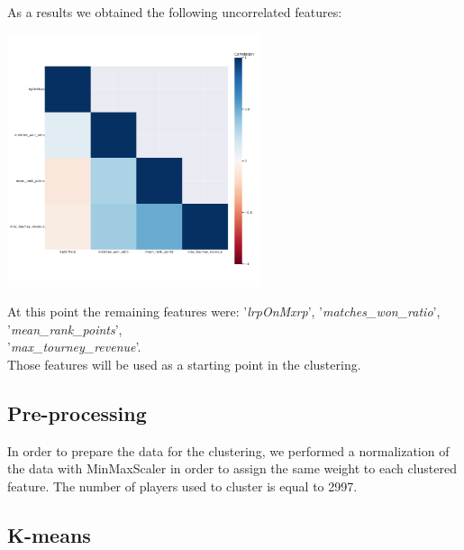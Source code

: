 As a results we obtained the following uncorrelated features:
\begin{center}
	\includegraphics[width=280px]{plots/correlation_plot}
	\label{fig:correlation_plot}
	\label{fig1}
\end{center}
At this point the remaining features were: '\textit{lrpOnMxrp}', '\textit{matches\_won\_ratio}', '\textit{mean\_rank\_points}',\\ '\textit{max\_tourney\_revenue}'.\\
Those features will be used as a starting point in the clustering.

\subsection{Pre-processing}
In order to prepare the data for the clustering, we performed a normalization of the data with MinMaxScaler in order to assign the same weight to each clustered feature.
The number of players used to cluster is equal to 2997.

\subsection{K-means}
\label{sec:k-means}

